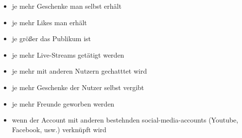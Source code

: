 \begin{itemize}
	\item je mehr Geschenke man selbst erh\"alt
	\item je mehr Likes man erh\"alt
	\item je größer das Publikum ist
	\item je mehr Live-Streams get\"atigt werden
	\item je mehr mit anderen Nutzern gechatttet wird
	\item je mehr Geschenke der Nutzer selbst vergibt
	\item je mehr Freunde geworben werden
	\item wenn der Account mit anderen bestehnden social-media-accounts (Youtube, Facebook, usw.) verkn\"upft wird
\end{itemize}
